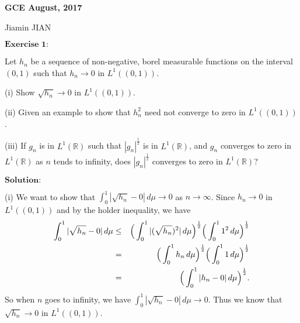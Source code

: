\documentclass[12pt,a4paper]{ctexart}
\begin{document}
\begin{center}
\textbf{ GCE August, 2017}
\vspace{8pt}

Jiamin JIAN
\end{center}

\vspace{12pt}

$\textbf{Exercise 1:}$

Let $h_{n}$ be a sequence of non-negative, borel measurable functions on the interval $(0, 1)$ such that $h_{n} \rightarrow 0$ in $L^{1}((0, 1))$.

(i) Show $\sqrt{h_{n}} \rightarrow 0$ in $L^{1}((0, 1))$.

(ii) Given an example to show that $h_{n}^{2}$ need not converge to zero in $L^{1}((0, 1))$.

(iii) If $g_{n}$ is in $L^{1}(\mathbb{R})$ such that $|g_{n}|^{\frac{1}{2}}$ is in $L^{1}(\mathbb{R})$, and $g_{n}$ converges to zero in $L^{1}(\mathbb{R})$ as $n$ tends to infinity, does $|g_{n}|^{\frac{1}{2}}$ converges to zero in $L^{1}(\mathbb{R})$?

\vspace{8pt}

$\textbf{Solution:}$

(i) We want to show that $\int_{0}^{1} |\sqrt{h_{n}} - 0| \, d \mu \rightarrow 0$ as $n \rightarrow \infty$. Since $h_{n} \rightarrow 0$ in $L^{1}((0, 1))$ and by the holder inequality, we have
\begin{eqnarray*}
\int_{0}^{1} |\sqrt{h_{n}} - 0| \, d \mu & \leq & \Big{(} \int_{0}^{1} |(\sqrt{h_{n}})^{2}| \, d \mu \Big{)}^{\frac{1}{2}} \Big{(} \int_{0}^{1} 1^{2} \, d \mu \Big{)}^{\frac{1}{2}} \\
& = & \Big{(} \int_{0}^{1} h_{n} \, d \mu \Big{)}^{\frac{1}{2}} \Big{(} \int_{0}^{1} 1 \, d \mu \Big{)}^{\frac{1}{2}} \\
& = & \Big{(} \int_{0}^{1} |h_{n}-0| \, d \mu \Big{)}^{\frac{1}{2}}.
\end{eqnarray*}
So when $n$ goes to infinity, we have $\int_{0}^{1} |\sqrt{h_{n}} - 0| \, d \mu \rightarrow 0$. Thus we know that $\sqrt{h_{n}} \rightarrow 0$ in $L^{1}((0, 1))$.
\end{document}
